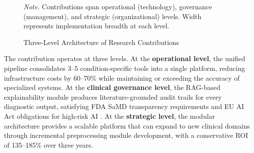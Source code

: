 \begin{figure}[H]
\caption{Three-Level Architecture of Research Contributions}
\label{fig:contribution_pyramid}
\vspace{0.5em}\noindent\textit{Note.} Contributions span operational (technology), governance (management), and strategic (organizational) levels. Width represents implementation breadth at each level.
\end{figure}

The contribution operates at three levels. At the \textbf{operational level}, the unified pipeline consolidates 3--5 condition-specific tools into a single platform, reducing infrastructure costs by 60--70\% while maintaining or exceeding the accuracy of specialized systems. At the \textbf{clinical governance level}, the RAG-based explainability module produces literature-grounded audit trails for every diagnostic output, satisfying FDA SaMD transparency requirements \citep{fda2021aiml} and EU AI Act obligations for high-risk AI \citep{eu2021aiact}. At the \textbf{strategic level}, the modular architecture provides a scalable platform that can expand to new clinical domains through incremental preprocessing module development, with a conservative ROI of 135--185\% over three years.

